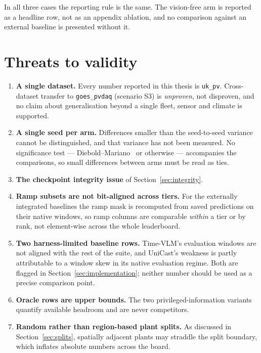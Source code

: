 In all three cases the reporting rule is the same. The vision-free arm is reported as a
headline row, not as an appendix ablation, and no comparison against an external baseline is
presented without it.

\section{Threats to validity}
\label{sec:threats}

\begin{enumerate}
  \item \textbf{A single dataset.} Every number reported in this thesis is
    \texttt{uk\_pv}. Cross-dataset transfer to \texttt{goes\_pvdaq} (scenario S3) is
    \emph{unproven}, not disproven, and no claim about generalisation beyond a single
    fleet, sensor and climate is supported.
  \item \textbf{A single seed per arm.} Differences smaller than the seed-to-seed variance
    cannot be distinguished, and that variance has not been measured. No significance test
    --- Diebold--Mariano~\cite{diebold} or otherwise --- accompanies the comparisons, so
    small differences between arms must be read as ties.
  \item \textbf{The checkpoint integrity issue} of Section~\ref{sec:integrity}.
  \item \textbf{Ramp subsets are not bit-aligned across tiers.} For the externally
    integrated baselines the ramp mask is recomputed from saved predictions on their native
    windows, so ramp columns are comparable \emph{within} a tier or by rank, not
    element-wise across the whole leaderboard.
  \item \textbf{Two harness-limited baseline rows.} Time-VLM's evaluation windows are not
    aligned with the rest of the suite, and UniCast's weakness is partly attributable to a
    window skew in its native evaluation regime. Both are flagged in
    Section~\ref{sec:implementation}; neither number should be used as a precise comparison
    point.
  \item \textbf{Oracle rows are upper bounds.} The two privileged-information variants
    quantify available headroom and are never competitors.
  \item \textbf{Random rather than region-based plant splits.} As discussed in
    Section~\ref{sec:splits}, spatially adjacent plants may straddle the split boundary,
    which inflates absolute numbers across the board.
\end{enumerate}

\par


